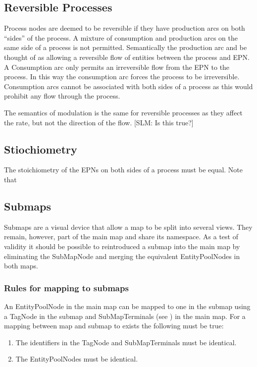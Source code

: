 \subsection{Reversible Processes}
\label{sec: semantics reversible procs}

Process nodes are deemed to be reversible if they have production arcs on both ``sides'' of the process. A mixture of consumption and production arcs on the same side of a process is not permitted. Semantically the production arc and be thought of as allowing a reversible flow of entities between the process and EPN. A Consumption arc only permits an irreversible flow from the EPN to the process. In this way the consumption arc forces the process to be irreversible. Consumption arcs cannot be associated with both sides of a process as this would prohibit any flow through the process.

The semantics of modulation is the same for reversible processes as they affect the rate, but not the direction of the flow. [SLM: Is this true?]

\subsection{Stiochiometry}

The stoichiometry of the EPNs on both sides of a process must be equal. Note that

\subsection{Submaps}

Submaps are a visual device that allow a map to be split into several
views. They remain, however, part of the main map and share its
namespace. As a test of validity it should be possible to reintroduced
a submap into the main map by eliminating the SubMapNode and merging
the equivalent EntityPoolNodes in both maps.

\subsubsection{Rules for mapping to submaps}

An EntityPoolNode in the main map can be mapped to one in the submap
using a TagNode in the submap and SubMapTerminals (see ) in the main map. For a
mapping between map and submap to exists the following must be true:

\begin{enumerate}
\item The identifiers in the TagNode and SubMapTerminals must be identical.
\item The EntityPoolNodes must be identical.
\end{enumerate}

